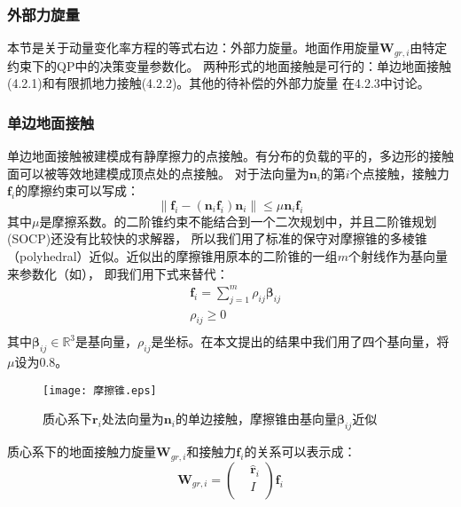 \subsubsection{外部力旋量}
本节是关于动量变化率方程的等式右边：外部力旋量。地面作用旋量${\boldsymbol{W}}_{gr,i}$由特定约束下的QP中的决策变量参数化。
两种形式的地面接触是可行的：单边地面接触(4.2.1)和有限抓地力接触(4.2.2)。其他的待补偿的外部力旋量 在4.2.3中讨论。
\subsubsection{单边地面接触}
单边地面接触被建模成有静摩擦力的点接触。有分布的负载的平的，多边形的接触面可以被等效地建模成顶点处的点接触。
对于法向量为${{\boldsymbol{n}}_{i}}$的第$i$个点接触，接触力${{\boldsymbol{f}}_{i}}$的摩擦约束可以写成：
\begin{equation}
    \label{equ:friction_cone}
    \left\| {{\boldsymbol{f}}_{i}}-({{\boldsymbol{n}}_{i}}{{\boldsymbol{f}}_{i}}){{\boldsymbol{n}}_{i}} \right\|\le \mu {{\boldsymbol{n}}_{i}}{{\boldsymbol{f}}_{i}}
\end{equation}
其中$\mu$是摩擦系数。的二阶锥约束不能结合到一个二次规划中，并且二阶锥规划(SOCP)还没有比较快的求解器，
所以我们用了标准的保守对摩擦锥的多棱锥（polyhedral）近似。近似出的摩擦锥用原本的二阶锥的一组$m$个射线作为基向量来参数化（如），
即我们用下式来替代：
\begin{equation}
    \label{equ:friction_para}
    \begin{aligned}
        & {{\boldsymbol{f}}_{i}}=\sum\limits_{j=1}^{m}{{{\rho }_{ij}}{{\boldsymbol{\beta}}_{ij}}} \\ 
       & {{\rho }_{ij}}\ge 0 \\ 
      \end{aligned}      
\end{equation}
其中$\boldsymbol{\beta}_{ij} \in \mathbb{R}^3$是基向量，$\rho_{ij}$是坐标。在本文提出的结果中我们用了四个基向量，将$\mu$设为0.8。
\begin{figure}[htbp]
    \centering
    \texttt{[image: 摩擦锥.eps]}
    \caption{\label{fig:friction_cone}质心系下$\boldsymbol{r}_{i}$处法向量为${{\boldsymbol{n}}_{i}}$的单边接触，摩擦锥由基向量$\boldsymbol{\beta}_{ij}$近似}
\end{figure}
质心系下的地面接触力旋量${{\boldsymbol{W}}_{gr,i}}$和接触力${{\boldsymbol{f}}_{i}}$的关系可以表示成：
\begin{equation}
    \label{equ:contact_wrench}
    {\boldsymbol{W}_{gr,i}}=\left( \begin{aligned}
        & {{{\hat{\boldsymbol{r}}}}_{i}} \\ 
       & I \\ 
      \end{aligned} \right){\boldsymbol{f}_{i}}      
\end{equation}
